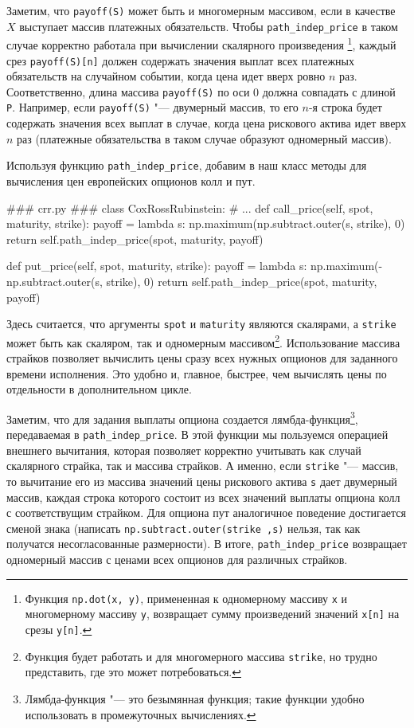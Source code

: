 Заметим, что \verb"payoff(S)" может быть и многомерным массивом, если в качестве $X$ выступает массив платежных обязательств.
Чтобы \verb"path_indep_price" в таком случае корректно работала при вычислении скалярного произведения%
\footnote{Функция \verb"np.dot(x, y)", примененная к одномерному массиву \verb"x" и многомерному массиву \verb"y", возвращает сумму произведений значений \verb"x[n]" на срезы \verb"y[n]".},
каждый срез \verb"payoff(S)[n]" должен содержать значения выплат всех платежных обязательств на случайном событии, когда цена идет вверх ровно $n$ раз. Соответственно, длина массива \verb"payoff(S)" по оси 0 должна совпадать с длиной \verb"P".
Например, если \verb"payoff(S)" "--- двумерный массив, то его $n$-я строка будет содержать значения всех выплат в случае, когда цена рискового актива идет вверх $n$ раз (платежные обязательства в таком случае образуют одномерный массив).

Используя функцию \verb"path_indep_price", добавим в наш класс методы для вычисления цен европейских опционов колл и пут.
\begin{python}
### crr.py ###
class CoxRossRubinstein:
    # ...
    def call_price(self, spot, maturity, strike):
        payoff = lambda s: np.maximum(np.subtract.outer(s, strike), 0)
        return self.path_indep_price(spot, maturity, payoff)
    
    def put_price(self, spot, maturity, strike):
        payoff = lambda s: np.maximum(-np.subtract.outer(s, strike), 0)
        return self.path_indep_price(spot, maturity, payoff)
\end{python}
Здесь считается, что аргументы \verb"spot" и \verb"maturity" являются скалярами, а \verb"strike" может быть как скаляром, так и одномерным массивом\footnote{Функция будет работать и для многомерного массива \verb"strike", но трудно представить, где это может потребоваться.}.
Использование массива страйков позволяет вычислить цены сразу всех нужных опционов для заданного времени исполнения.
Это удобно и, главное, быстрее, чем вычислять цены по отдельности в дополнительном цикле.

Заметим, что для задания выплаты опциона создается лямбда-функция\footnote{Лямбда-функция "--- это безымянная функция; такие функции удобно использовать в промежуточных вычислениях.}, передаваемая в \verb"path_indep_price".
В этой функции мы пользуемся операцией внешнего вычитания, которая позволяет корректно учитывать как случай скалярного страйка, так и массива страйков.
А именно, если \verb"strike" "--- массив, то вычитание его из массива значений цены рискового актива \verb"s" дает двумерный массив, каждая строка которого состоит из всех значений выплаты опциона колл с соответствущим страйком.
Для опциона пут аналогичное поведение достигается сменой знака (написать \verb"np.subtract.outer(strike ,s)" нельзя, так как получатся несогласованные размерности).
В итоге, \verb"path_indep_price" возвращает одномерный массив с ценами всех опционов для различных страйков.

